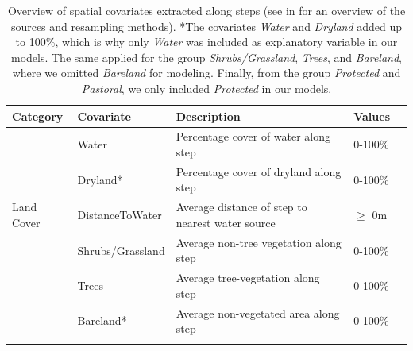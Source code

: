 \documentclass[abstract=on,10pt,a4paper,bibliography=totocnumbered]{scrartcl}
\begin{document}
\begin{table}[h]
  \begin{center}
    \caption{Overview of spatial covariates extracted along steps (see
     in  for an overview of the sources and
    resampling methods). *The covariates \textit{Water} and \textit{Dryland}
    added up to 100\%, which is why only \textit{Water} was included as
    explanatory variable in our models. The same applied for the group
    \textit{Shrubs/Grassland}, \textit{Trees}, and \textit{Bareland}, where we
    omitted \textit{Bareland} for modeling. Finally, from the group
    \textit{Protected} and \textit{Pastoral}, we only included
    \textit{Protected} in our models.}
    \label{ExtractedCovars}
    \resizebox{\textwidth}{!} {
      \begin{tabular}{lllll}
      \hline
      \textbf{Category} &
        \textbf{Covariate} &
          \textbf{Description} &
            \textbf{Values} \\
      \midrule
      \multirow{5}{*}{Land Cover}
        & Water
          & Percentage cover of water along step
            & 0-100\%\\
        & Dryland*
          & Percentage cover of dryland along step
            & 0-100\%\\
        & DistanceToWater
          & Average distance of step to nearest water source
            & \(\geq\) 0m\\
        & Shrubs/Grassland
          & Average non-tree vegetation along step
            & 0-100\%\\
        & Trees
          & Average tree-vegetation along step
            & 0-100\%\\
        & Bareland*
          & Average non-vegetated area along step
            & 0-100\%\\
      \hdashline
      \multirow{2}{*}{Protection Status}

\end{tabular}}
\end{center}
\end{table}
\end{document}
